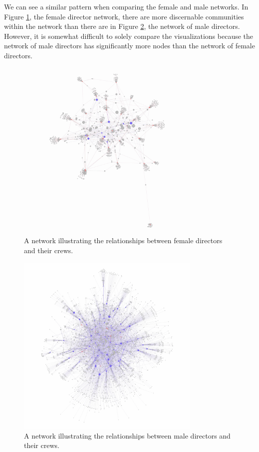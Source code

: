 \documentclass[12pt]{article}
\begin{document}
We can see a similar pattern when comparing the female and male networks. In Figure \ref{fig:femaleEgo}, the female director network, there are more discernable communities within the network than there are in Figure \ref{fig:maleEgo}, the network of male directors. However, it is somewhat difficult to solely compare the visualizations because the network of male directors has significantly more nodes than the network of female directors.
\begin{figure}[H]
    \centering
    \includegraphics[width=250pt, scale=0.5] {3_female_egonetwork.jpg}
    \caption{A network illustrating the relationships between female directors and their crews.}
    \label{fig:femaleEgo}
\end{figure}
\begin{figure}[H]
    \centering
    \includegraphics[width=250pt, scale=0.5] {3_male_egonetwork.jpg}
    \caption{A network illustrating the relationships between male directors and their crews.}
    \label{fig:maleEgo}
\end{figure}
\end{document}
